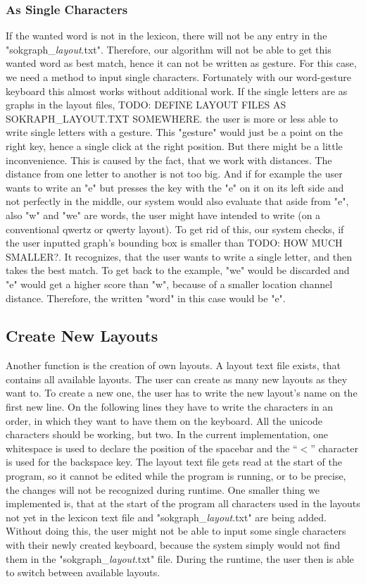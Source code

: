 \subsubsection{As Single Characters}
If the wanted word is not in the lexicon, there will not be any entry in the "sokgraph\_\textit{layout}.txt". Therefore, our algorithm will not be able to get this wanted word as best match, hence it can not be written as gesture. For this case, we need a method to input single characters. Fortunately with our word-gesture keyboard this almost works without additional work. If the single letters are as graphs in the layout files, TODO: DEFINE LAYOUT FILES AS SOKRAPH\_LAYOUT.TXT SOMEWHERE. the user is more or less able to write single letters with a gesture. This "gesture" would just be a point on the right key, hence a single click at the right position. But there might be a little inconvenience. This is caused by the fact, that we work with distances. The distance from one letter to another is not too big. And if for example the user wants to write an "e" but presses the key with the "e" on it on its left side and not perfectly in the middle, our system would also evaluate that aside from "e", also "w" and "we" are words, the user might have intended to write (on a conventional qwertz or qwerty layout). To get rid of this, our system checks, if the user inputted graph's bounding box is smaller than TODO: HOW MUCH SMALLER?. It recognizes, that the user wants to write a single letter, and then takes the best match. To get back to the example, "we" would be discarded and "e" would get a higher score than "w", because of a smaller location channel distance. Therefore, the written "word" in this case would be "e".

\subsection{Create New Layouts}
Another function is the creation of own layouts. A layout text file exists, that contains all available layouts. The user can create as many new layouts as they want to. To create a new one, the user has to write the new layout's name on the first new line. On the following lines they have to write the characters in an order, in which they want to have them on the keyboard. All the unicode characters should be working, but two. In the current implementation, one whitespace is used to declare the position of the spacebar and the ``$<$'' character is used for the backspace key. The layout text file gets read at the start of the program, so it cannot be edited while the program is running, or to be precise, the changes will not be recognized during runtime. One smaller thing we implemented is, that at the start of the program all characters used in the layouts not yet in the lexicon text file and "sokgraph\_\textit{layout}.txt" are being added. Without doing this, the user might not be able to input some single characters with their newly created keyboard, because the system simply would not find them in the "sokgraph\_\textit{layout}.txt" file. During the runtime, the user then is able to switch between available layouts.

